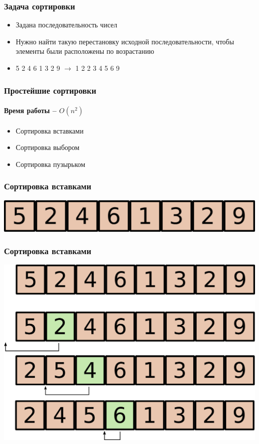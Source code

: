 \documentclass[14pt,pdf,hyperref={unicode}]{beamer}
\begin{document}
\begin{frame}[fragile]
\frametitle{Задача сортировки} 
\begin{itemize}
\item Задана последовательность чисел \\
\item Нужно найти такую перестановку исходной последовательности, чтобы элементы были расположены по возрастанию  \\
\item 5 2 4 6 1 3 2 9  $\rightarrow$ 1 2 2 3 4 5 6 9
\end{itemize}
\end{frame}


\begin{frame}[fragile]
\frametitle{Простейшие сортировки} 
\framesubtitle{Время работы -- $O(n^2)$} 
\begin{itemize}
\item Сортировка вставками \\
\item Сортировка выбором \\
\item Сортировка пузырьком \\
\end{itemize}
\end{frame}




\begin{frame}[fragile]
\frametitle{Сортировка вставками} 
\begin{center}
\includegraphics[scale=0.85]{images/sorting0.png}
\end{center}
\end{frame}

\begin{frame}[fragile]
\frametitle{Сортировка вставками} 
\begin{center}
\includegraphics[scale=0.85]{images/sorting_insert_4in1_1.png}
\end{center}
\end{frame}
\end{document}
